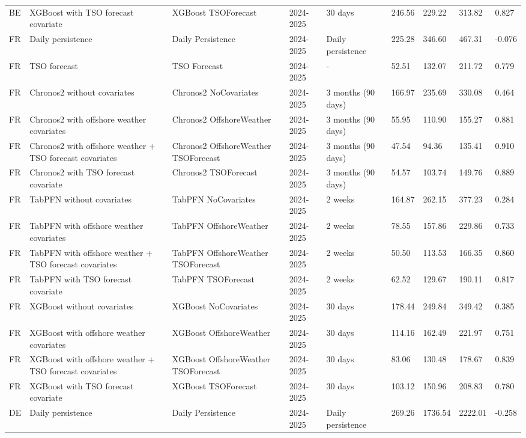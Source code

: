 \begin{longtable}{lllllllll}
BE & XGBoost with TSO forecast covariate & XGBoost TSOForecast & 2024-2025 & 30 days & 246.56 & 229.22 & 313.82 & 0.827 \\
FR & Daily persistence & Daily Persistence & 2024-2025 & Daily persistence & 225.28 & 346.60 & 467.31 & -0.076 \\
FR & TSO forecast & TSO Forecast & 2024-2025 & - & 52.51 & 132.07 & 211.72 & 0.779 \\
FR & Chronos2 without covariates & Chronos2 NoCovariates & 2024-2025 & 3 months (90 days) & 166.97 & 235.69 & 330.08 & 0.464 \\
FR & Chronos2 with offshore weather covariates & Chronos2 OffshoreWeather & 2024-2025 & 3 months (90 days) & 55.95 & 110.90 & 155.27 & 0.881 \\
FR & Chronos2 with offshore weather + TSO forecast covariates & Chronos2 OffshoreWeather TSOForecast & 2024-2025 & 3 months (90 days) & 47.54 & 94.36 & 135.41 & 0.910 \\
FR & Chronos2 with TSO forecast covariate & Chronos2 TSOForecast & 2024-2025 & 3 months (90 days) & 54.57 & 103.74 & 149.76 & 0.889 \\
FR & TabPFN without covariates & TabPFN NoCovariates & 2024-2025 & 2 weeks & 164.87 & 262.15 & 377.23 & 0.284 \\
FR & TabPFN with offshore weather covariates & TabPFN OffshoreWeather & 2024-2025 & 2 weeks & 78.55 & 157.86 & 229.86 & 0.733 \\
FR & TabPFN with offshore weather + TSO forecast covariates & TabPFN OffshoreWeather TSOForecast & 2024-2025 & 2 weeks & 50.50 & 113.53 & 166.35 & 0.860 \\
FR & TabPFN with TSO forecast covariate & TabPFN TSOForecast & 2024-2025 & 2 weeks & 62.52 & 129.67 & 190.11 & 0.817 \\
FR & XGBoost without covariates & XGBoost NoCovariates & 2024-2025 & 30 days & 178.44 & 249.84 & 349.42 & 0.385 \\
FR & XGBoost with offshore weather covariates & XGBoost OffshoreWeather & 2024-2025 & 30 days & 114.16 & 162.49 & 221.97 & 0.751 \\
FR & XGBoost with offshore weather + TSO forecast covariates & XGBoost OffshoreWeather TSOForecast & 2024-2025 & 30 days & 83.06 & 130.48 & 178.67 & 0.839 \\
FR & XGBoost with TSO forecast covariate & XGBoost TSOForecast & 2024-2025 & 30 days & 103.12 & 150.96 & 208.83 & 0.780 \\
DE & Daily persistence & Daily Persistence & 2024-2025 & Daily persistence & 269.26 & 1736.54 & 2222.01 & -0.258 \\

\end{longtable}
